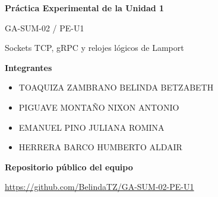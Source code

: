 \documentclass[12pt,a4paper]{article}
\begin{document}
\begin{center}
{\Large\bfseries Práctica Experimental de la Unidad 1}\par
\vspace{0.5cm}
{\large GA-SUM-02 / PE-U1}\par
\vspace{0.3cm}
Sockets TCP, gRPC y relojes lógicos de Lamport
\end{center}
\vspace{1cm}
\noindent\textbf{Integrantes}\par
\begin{itemize}
\item TOAQUIZA ZAMBRANO BELINDA BETZABETH
\item PIGUAVE MONTAÑO NIXON ANTONIO
\item EMANUEL PINO JULIANA ROMINA
\item HERRERA BARCO HUMBERTO ALDAIR
\end{itemize}
\vspace{0.7cm}
\noindent\textbf{Repositorio público del equipo}\par
\medskip
\noindent\url{https://github.com/BelindaTZ/GA-SUM-02-PE-U1}
\end{document}
